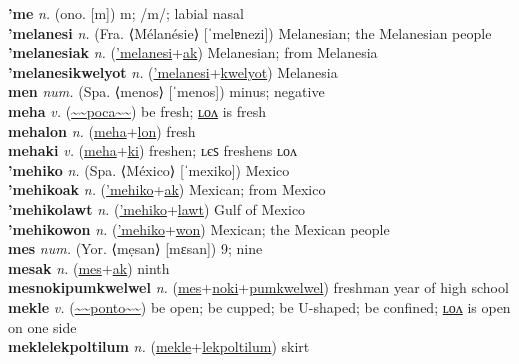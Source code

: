 \textbf{'me} \textit{n.} (ono. [m])
m; /m/; labial nasal \label{'me} \\
\textbf{'melanesi} \textit{n.} (Fra. ⟨Mélanésie⟩ [ˈmelɐnezi])
Melanesian; the Melanesian people \label{'melanesi} \\
\textbf{'melanesiak} \textit{n.} (\hyperref['melanesi]{'melanesi}+\hyperref[ak]{ak})
Melanesian; from Melanesia \label{'melanesiak} \\
\textbf{'melanesikwelyot} \textit{n.} (\hyperref['melanesi]{'melanesi}+\hyperref[kwelyot]{kwelyot})
Melanesia \label{'melanesikwelyot} \\
\textbf{men} \textit{num.} (Spa. ⟨menos⟩ [ˈmenos])
minus; negative \label{men} \\
\textbf{meha} \textit{v.} (\hyperref[poca]{\~{}\~{}poca\~{}\~{}})
be fresh; \hyperref[mehalon]{ʟᴏᴧ} is fresh \label{meha} \\
\textbf{mehalon} \textit{n.} (\hyperref[meha]{meha}+\hyperref[lon]{lon})
fresh \label{mehalon} \\
\textbf{mehaki} \textit{v.} (\hyperref[meha]{meha}+\hyperref[ki]{ki})
freshen; ʟєꜱ freshens ʟᴏᴧ \label{mehaki} \\
\textbf{'mehiko} \textit{n.} (Spa. ⟨México⟩ [ˈmexiko])
Mexico \label{'mehiko} \\
\textbf{'mehikoak} \textit{n.} (\hyperref['mehiko]{'mehiko}+\hyperref[ak]{ak})
Mexican; from Mexico \label{'mehikoak} \\
\textbf{'mehikolawt} \textit{n.} (\hyperref['mehiko]{'mehiko}+\hyperref[lawt]{lawt})
Gulf of Mexico \label{'mehikolawt} \\
\textbf{'mehikowon} \textit{n.} (\hyperref['mehiko]{'mehiko}+\hyperref[won]{won})
Mexican; the Mexican people \label{'mehikowon} \\
\textbf{mes} \textit{num.} (Yor. ⟨mẹsan⟩ [mɛsan])
9; nine \label{mes} \\
\textbf{mesak} \textit{n.} (\hyperref[mes]{mes}+\hyperref[ak]{ak})
ninth \label{mesak} \\
\textbf{mesnokipumkwelwel} \textit{n.} (\hyperref[mes]{mes}+\hyperref[noki]{noki}+\hyperref[pumkwelwel]{pumkwelwel})
freshman year of high school \label{mesnokipumkwelwel} \\
\textbf{mekle} \textit{v.} (\hyperref[ponto]{\~{}\~{}ponto\~{}\~{}})
be open; be cupped; be U-shaped; be confined; \hyperref[meklelon]{ʟᴏᴧ} is open on one side \label{mekle} \\
\textbf{meklelekpoltilum} \textit{n.} (\hyperref[mekle]{mekle}+\hyperref[lekpoltilum]{lekpoltilum})
skirt \label{meklelekpoltilum} \\
